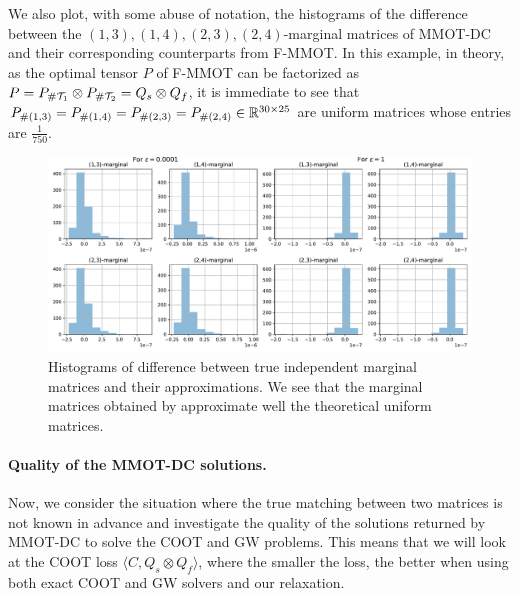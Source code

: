 We also plot, with some abuse of notation, the histograms of the difference between
the $(1,3), (1,4), (2,3), (2,4)$-marginal matrices of MMOT-DC and their corresponding counterparts from F-MMOT.
In this example, in theory, as the optimal tensor $P$ of F-MMOT can be factorized as
$P = P_{\# \mathcal T_1} \otimes P_{\# \mathcal T_2} = Q_s \otimes Q_f$,
it is immediate to see that $P_{\# (1,3)} = P_{\# (1,4)} = P_{\# (2,3)} = P_{\# (2,4)} \in \mathbb R^{30 \times 25}$
are uniform matrices whose entries are $\frac{1}{750}$.
\begin{figure}[t]
  \centering
  \includegraphics[width=1.\textwidth,height=1.\textheight,keepaspectratio]{./Chapitre2/fig/other_marginals.pdf}
  \caption{Histograms of difference between true independent marginal matrices and their approximations. We see that the marginal matrices obtained
  by  approximate well the theoretical uniform matrices.}
  \label{fig:other_marg}
\end{figure}

\paragraph{Quality of the MMOT-DC solutions. \label{expe:2}}


Now, we consider the situation where the true matching between two matrices is not known in advance and investigate the quality
of the solutions returned by MMOT-DC to solve the COOT and GW problems. This means that we will look at the COOT loss
$\langle C, Q_s \otimes Q_f \rangle$, where the smaller the loss, the better when using both exact COOT and GW solvers
and our relaxation.

